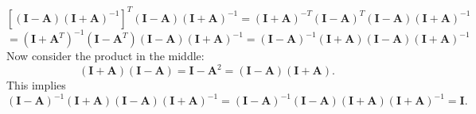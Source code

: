 \documentclass[11pt,fleqn]{article}
\begin{document}
\begin{enumerate}
\begin{itemize}
	\[\left[(\mathbf{I}-\mathbf{A})(\mathbf{I}+\mathbf{A})^{-1}\right]^T(\mathbf{I}-\mathbf{A})(\mathbf{I}+\mathbf{A})^{-1}=(\mathbf{I}+\mathbf{A})^{-T}(\mathbf{I}-\mathbf{A})^T(\mathbf{I}-\mathbf{A})(\mathbf{I}+\mathbf{A})^{-1}\]
	\[=(\mathbf{I}+\mathbf{A}^T)^{-1}(\mathbf{I}-\mathbf{A}^T)(\mathbf{I}-\mathbf{A})(\mathbf{I}+\mathbf{A})^{-1}=(\mathbf{I}-\mathbf{A})^{-1}(\mathbf{I}+\mathbf{A})(\mathbf{I}-\mathbf{A})(\mathbf{I}+\mathbf{A})^{-1}\]
	Now consider the product in the middle:
	\[(\mathbf{I}+\mathbf{A})(\mathbf{I}-\mathbf{A}) = \mathbf{I} - \mathbf{A}^2 = (\mathbf{I}-\mathbf{A})(\mathbf{I}+\mathbf{A}).\]
	This implies
	\[(\mathbf{I}-\mathbf{A})^{-1}(\mathbf{I}+\mathbf{A})(\mathbf{I}-\mathbf{A})(\mathbf{I}+\mathbf{A})^{-1}=(\mathbf{I}-\mathbf{A})^{-1}(\mathbf{I}-\mathbf{A})(\mathbf{I}+\mathbf{A})(\mathbf{I}+\mathbf{A})^{-1} = \mathbf{I}.\]
	\end{itemize}
\end{enumerate}
 
\end{document}
